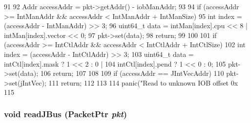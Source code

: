 \begin{DoxyCode}
91 {
92         Addr accessAddr = pkt->getAddr() - iobManAddr;
93 
94         if (accessAddr >= IntManAddr && accessAddr < IntManAddr + IntManSize) {
95             int index = (accessAddr - IntManAddr) >> 3;
96             uint64_t data = intMan[index].cpu << 8 | intMan[index].vector << 0;
97             pkt->set(data);
98             return;
99         }
100 
101         if (accessAddr >= IntCtlAddr && accessAddr < IntCtlAddr + IntCtlSize) {
102             int index = (accessAddr - IntCtlAddr) >> 3;
103             uint64_t data = intCtl[index].mask  ? 1 << 2 : 0 |
104                 intCtl[index].pend  ? 1 << 0 : 0;
105             pkt->set(data);
106             return;
107         }
108 
109         if (accessAddr == JIntVecAddr) {
110             pkt->set(jIntVec);
111             return;
112         }
113 
114         panic("Read to unknown IOB offset 0x%
115 }
\end{DoxyCode}
\hypertarget{classIob_a04a9ec2ef24eaa5002c2c211e83e4067}{
\subsubsection[{readJBus}]{\setlength{\rightskip}{0pt plus 5cm}void readJBus ({\bf PacketPtr} {\em pkt})}}
\label{classIob_a04a9ec2ef24eaa5002c2c211e83e4067}




